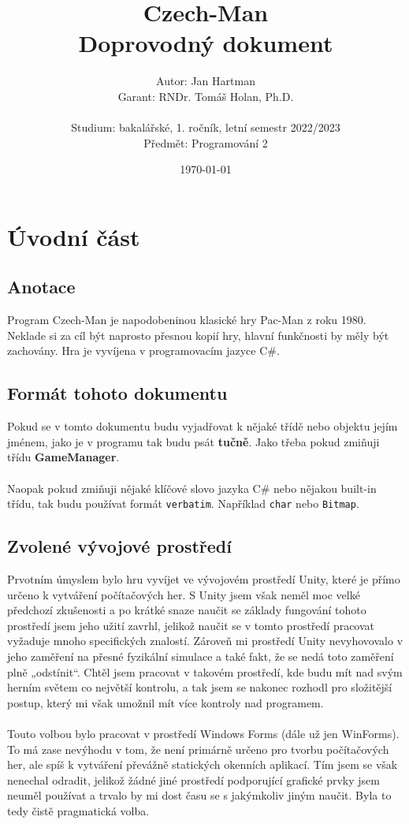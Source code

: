 \documentclass[a4]{article}
\title{Czech-Man
\\Doprovodný dokument}
\author{Autor: Jan Hartman
\\Garant: RNDr. Tomáš Holan, Ph.D.
\\\\Studium: bakalářské, 1. ročník, letní semestr 2022/2023
\\Předmět: Programování 2}
\date{\today}
\begin{document}
\maketitle
\tableofcontents
\pagestyle{fancy}
\newpage
\section{Úvodní část}
\subsection{Anotace}
Program Czech-Man je napodobeninou klasické hry Pac-Man z roku 1980. Neklade si za cíl být naprosto přesnou kopií hry, hlavní funkčnosti by měly být zachovány. Hra je vyvíjena v programovacím jazyce C\#.
\subsection{Formát tohoto dokumentu}
Pokud se v tomto dokumentu budu vyjadřovat k nějaké třídě nebo objektu jejím jménem, jako je v programu tak budu psát \textbf{tučně}. Jako třeba pokud zmiňuji třídu \textbf{GameManager}.
\\\\
Naopak pokud zmiňuji nějaké klíčové slovo jazyka C\# nebo nějakou built-in třídu, tak budu používat formát \verb|verbatim|. Například \verb|char| nebo \verb|Bitmap|.
\subsection{Zvolené vývojové prostředí}
Prvotním úmyslem bylo hru vyvíjet ve vývojovém prostředí Unity, které je přímo určeno k vytváření počítačových her. S Unity jsem však neměl moc velké předchozí zkušenosti a po krátké snaze naučit se základy fungování tohoto prostředí jsem jeho užití zavrhl, jelikož naučit se v tomto prostředí pracovat vyžaduje mnoho specifických znalostí. Zároveň mi prostředí Unity nevyhovovalo v jeho zaměření na přesné fyzikální simulace a také fakt, že se nedá toto zaměření plně „odstínit“. Chtěl jsem pracovat v takovém prostředí, kde budu mít nad svým herním světem co největší kontrolu, a tak jsem se nakonec rozhodl pro složitější postup, který mi však umožnil mít více kontroly nad programem.
\\\\
Touto volbou bylo pracovat v prostředí Windows Forms (dále už jen WinForms). To má zase nevýhodu v tom, že není primárně určeno pro tvorbu počítačových her, ale spíš k vytváření převážně statických okenních aplikací. Tím jsem se však nenechal odradit, jelikož žádné jiné prostředí podporující grafické prvky jsem neuměl používat a trvalo by mi dost času se s jakýmkoliv jiným naučit. Byla to tedy čistě pragmatická volba.
\newpage
\end{document}
